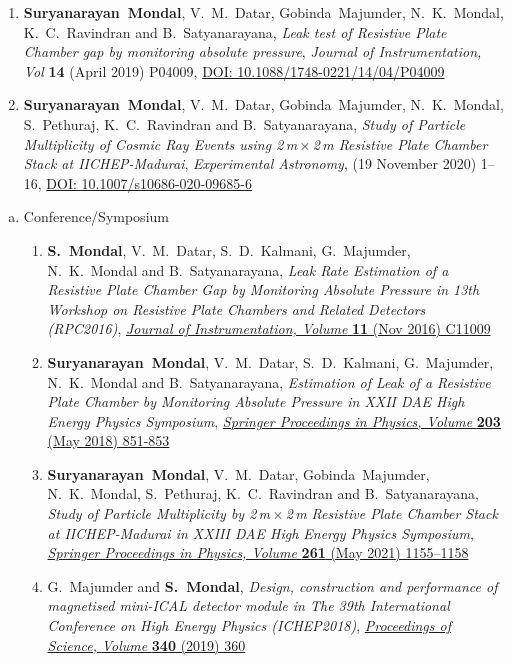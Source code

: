 \documentclass[12pt]{article}
\begin{document}
\begin{minipage}{1.05\textwidth}
\begin{enumerate}[a.]
    \begin{enumerate}[1.]
    \item {\bf Suryanarayan~Mondal}, V.~M.~Datar, Gobinda~Majumder, N.~K.~Mondal, K.~C.~Ravindran and B.~Satyanarayana, \emph{Leak test of Resistive Plate Chamber gap by monitoring absolute pressure}, \emph{Journal of Instrumentation, Vol} \textbf{14} (April 2019) P04009, \href{https://doi.org/10.1088/1748-0221/14/04/P04009}{DOI: 10.1088/1748-0221/14/04/P04009}
    \item {\bf Suryanarayan~Mondal}, V.~M.~Datar, Gobinda~Majumder, N.~K.~Mondal, S.~Pethuraj, K.~C.~Ravindran and B.~Satyanarayana, \emph{Study of Particle Multiplicity of Cosmic Ray Events using 2\,m\,$\times$\,2\,m Resistive Plate Chamber Stack at IICHEP-Madurai}, \emph{Experimental Astronomy}, (19 November 2020) 1--16, \href{https://doi.org/10.1007/s10686-020-09685-6}{DOI: 10.1007/s10686-020-09685-6}
    \end{enumerate} 
  \end{enumerate} 
  \begin{enumerate}[b.]
  \item Conference/Symposium
    \begin{enumerate}[1.]
    \item {\bf S.~Mondal}, V.~M.~Datar, S.~D.~Kalmani, G.~Majumder, N.~K.~Mondal and B.~Satyanarayana, \emph{Leak Rate Estimation of a Resistive Plate Chamber Gap by Monitoring Absolute Pressure in 13th Workshop on Resistive Plate Chambers and Related Detectors (RPC2016)}, \href{https://doi.org/10.1088/1748-0221/11/11/C11009}{\emph{Journal of Instrumentation, Volume } \textbf{11} (Nov 2016) C11009}
    \item {\bf Suryanarayan~Mondal}, V.~M.~Datar, S.~D.~Kalmani, G.~Majumder, N.~K.~Mondal and B.~Satyanarayana, \emph{Estimation of Leak of a Resistive Plate Chamber by Monitoring Absolute Pressure in XXII DAE High Energy Physics Symposium}, \href{https://doi.org/10.1007/978-3-319-73171-1_207}{\emph{Springer Proceedings in Physics, Volume } \textbf{203} (May 2018) 851-853}
    \item {\bf Suryanarayan~Mondal}, V.~M.~Datar, Gobinda~Majumder, N.~K.~Mondal, S.~Pethuraj, K.~C.~Ravindran and B.~Satyanarayana, \emph{Study of Particle Multiplicity by 2\,m\,$\times$\,2\,m Resistive Plate Chamber Stack at IICHEP-Madurai in XXIII DAE High Energy Physics Symposium}, \href{https://doi.org/10.1007/978-981-33-4408-2_172}{\emph{Springer Proceedings in Physics, Volume } \textbf{261} (May 2021) 1155--1158}
    \item G.~Majumder and {\bf S.~Mondal}, \emph{Design, construction and performance of magnetised mini-ICAL detector module in The 39th International Conference on High Energy Physics (ICHEP2018)}, \href{https://doi.org/10.22323/1.340.0360}{\emph{Proceedings of Science,} \textit{Volume} \textbf{340} (2019) 360}

\end{enumerate}
\end{enumerate}
\end{minipage}
\end{document}
